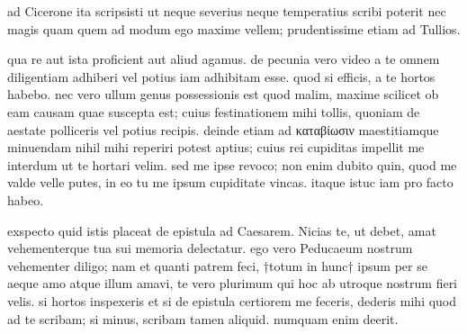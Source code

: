 


 ad Cicerone ita scripsisti ut neque severius neque temperatius scribi poterit nec magis quam quem ad modum ego maxime vellem; prudentissime etiam ad Tullios.

 qua re aut ista proficient aut aliud agamus. de pecunia vero video a te omnem diligentiam adhiberi vel potius iam adhibitam esse. quod si efficis, a te hortos habebo. nec vero ullum genus possessionis est quod malim, maxime scilicet ob eam causam quae suscepta est; cuius festinationem mihi tollis, quoniam de aestate polliceris vel potius recipis. deinde etiam ad καταβίωσιν maestitiamque minuendam nihil mihi reperiri potest aptius; cuius rei cupiditas impellit me interdum ut te hortari velim. sed me ipse revoco; non enim dubito quin, quod me valde velle putes, in eo tu me ipsum cupiditate vincas. itaque istuc iam pro facto habeo.

 exspecto quid istis placeat de epistula ad Caesarem. Nicias te, ut debet, amat vehementerque tua sui memoria delectatur. ego vero Peducaeum nostrum vehementer diligo; nam et quanti patrem feci, †totum in hunc† ipsum per se aeque amo atque illum amavi, te vero plurimum qui hoc ab utroque nostrum fieri velis. si hortos inspexeris et si de epistula certiorem me feceris, dederis mihi quod ad te scribam; si minus, scribam tamen aliquid. numquam enim deerit.
